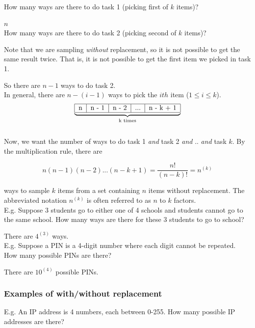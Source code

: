 \documentclass[12pt, letterpaper]{article}
\begin{document}
How many ways are there to do task 1 (picking first of \(k\) items)? 

\(n\)\\

How many ways are there to do task 2 (picking second of \(k\) items)? 

Note that we are sampling \emph{without} replacement, so it is not possible to get the same result twice. That is, it is not possible to get the first item we picked in task 1. 

So there are \(n - 1\) ways to do task 2.\\

In general, there are \(n - (i - 1)\) ways to pick the \(ith\) item (\(1 \leq i \leq k \)).\\

\[
\underbrace{
\begin{tabular}{|c|c|c|c|c|}
	\hline n & n - 1 & n - 2 & ... & n - k + 1  \\ \hline
\end{tabular}
}_\text{k times}
\]\\

Now, we want the number of ways to do task 1 \emph{and} task 2 \emph{and} .. \emph{and} task \(k\).
By the multiplication rule, there are 

\begin{equation}
n(n-1)(n-2)...(n-k+1) = \frac{n!}{(n-k)!} = n^{(k)}
\end{equation}

ways to sample \(k\) items from a set containing \(n\) items without replacement. The abbreviated notation \(n^{(k)}\) is often referred to as \(n\) to \(k\) factors.\\

E.g. Suppose 3 students go to either one of 4 schools and students cannot go to the same school. How many ways are there for these 3 students to go to school?

There are \(4^{(3)}\) ways.\\

E.g. Suppose a PIN is a 4-digit number where each digit cannot be repeated. How many possible PINs are there?

There are \(10^{(4)}\) possible PINs.

\subsubsection{Examples of with/without replacement}
E.g. An IP address is 4 numbers, each between 0-255. How many possible IP addresses are there?\\
\end{document}

